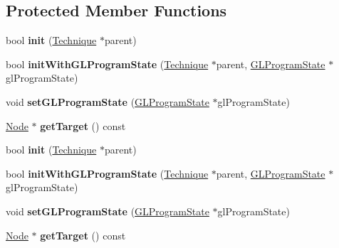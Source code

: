 \subsection*{Protected Member Functions}
\begin{DoxyCompactItemize}
\item 
\mbox{\label{classPass_a7a755ba16a38a295501c5821b492e65d}} 
bool {\bfseries init} (\hyperlink{classTechnique}{Technique} $\ast$parent)
\item 
\mbox{\label{classPass_abd50647920872bd56099c53ff9c78134}} 
bool {\bfseries init\+With\+G\+L\+Program\+State} (\hyperlink{classTechnique}{Technique} $\ast$parent, \hyperlink{classGLProgramState}{G\+L\+Program\+State} $\ast$gl\+Program\+State)
\item 
\mbox{\label{classPass_adeb21f6e151090c9bd708a37ee324542}} 
void {\bfseries set\+G\+L\+Program\+State} (\hyperlink{classGLProgramState}{G\+L\+Program\+State} $\ast$gl\+Program\+State)
\item 
\mbox{\label{classPass_ada1fb1efabdf70734bcff6efc1e47c99}} 
\hyperlink{classNode}{Node} $\ast$ {\bfseries get\+Target} () const
\item 
\mbox{\label{classPass_a7a755ba16a38a295501c5821b492e65d}} 
bool {\bfseries init} (\hyperlink{classTechnique}{Technique} $\ast$parent)
\item 
\mbox{\label{classPass_abd50647920872bd56099c53ff9c78134}} 
bool {\bfseries init\+With\+G\+L\+Program\+State} (\hyperlink{classTechnique}{Technique} $\ast$parent, \hyperlink{classGLProgramState}{G\+L\+Program\+State} $\ast$gl\+Program\+State)
\item 
\mbox{\label{classPass_adeb21f6e151090c9bd708a37ee324542}} 
void {\bfseries set\+G\+L\+Program\+State} (\hyperlink{classGLProgramState}{G\+L\+Program\+State} $\ast$gl\+Program\+State)
\item 
\mbox{\label{classPass_afc5f86c970257e0329c98cf8ab623319}} 
\hyperlink{classNode}{Node} $\ast$ {\bfseries get\+Target} () const
\end{DoxyCompactItemize}
